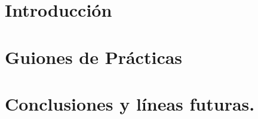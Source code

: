\documentclass[12pt,a4paper]{book} %
\begin{document}
\frontmatter


%


\newpage\null\thispagestyle{empty}\newpage













\mainmatter



\part{Introducción}



\part{Guiones de Prácticas}











\part{Conclusiones y líneas futuras.}
\end{document}
